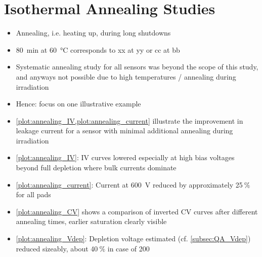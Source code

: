 \section{Isothermal Annealing Studies}
\label{sec:annealing}

\begin{itemize}
	\item Annealing, i.e. heating up, during long shutdowns
	\item \SI{80}{\minute} at \SI{60}{\celsius} corresponds to xx at yy or cc at bb
	\item Systematic annealing study for all sensors was beyond the scope of this study, and anyways not possible due to high temperatures / annealing during irradiation
	\item Hence: focus on one illustrative example
	\item \ref{plot:annealing_IV,plot:annealing_current} illustrate the improvement in leakage current for a sensor with minimal additional annealing during irradiation
	\item \ref{plot:annealing_IV}: IV curves lowered especially at high bias voltages beyond full depletion where bulk currents dominate
	\item \ref{plot:annealing_current}: Current at \SI{600}{\volt} reduced by approximately 25$~\%$ for all pads
	\item \ref{plot:annealing_CV} shows a comparison of inverted CV curves after different annealing times, earlier saturation clearly visible
	\item \ref{plot:annealing_Vdep}: Depletion voltage estimated (cf. \ref{subsec:QA_Vdep}) reduced sizeably, about 40$~\%$ in case of \SI{200}{\micron}
\end{itemize}

